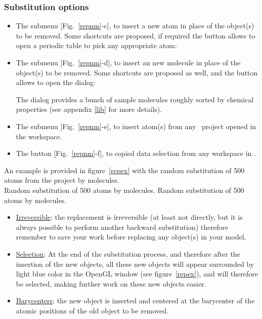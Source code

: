 \subsubsection*{Substitution options}
\begin{itemize}
\item The  submenu [Fig.~\ref{repnm}-c], to insert a new atom in place of the object(s) to be removed. 
Some shortcuts are proposed, if required the  button allows to open a periodic table to pick any appropriate atom: 
\begin{center}\end{center}
\item The  submenu [Fig.~\ref{repnm}-d], to insert an new molecule in place of the object(s) to be removed. 
Some shortcuts are proposed as well, and the  button allows to open the  dialog:
\begin{center}\end{center}
The  dialog provides a bunch of sample molecules roughly sorted by chemical properties (see appendix \ref{lib} for more details).
\item The  submenu [Fig.~\ref{repnm}-e], to insert atom(s) from any \atomes\ project opened in the workspace. 
\item The  button [Fig.~\ref{repnm}-f], to copied data selection from any workspace in \atomes. 
\end{itemize}
\noindent An example is provided in figure~\ref{repex} with the random substitution of 500  atoms from the \aob{\sio} project by  molecules. \\ 
{Random substitution of 500  atoms by  molecules.}
{Random substitution of 500  atoms by  molecules.}
\clearpage
{}
\begin{itemize}
\item \uline{Irreversible}: the replacement is irreversible (at least not directly, but it is always possible to perform another backward substitution)
therefore remember to save your work before replacing any object(s) in your model. 
\item \uline{Selection}: At the end of the substitution process, and therefore after the insertion of the new objects, 
all these new objects will appear surrounded by light blue color in the OpenGL window (see figure~\ref{repex}), and will therefore be selected, 
making further work on these new objects easier.  
\item \uline{Barycenters}: the new object is inserted and centered at the barycenter of the atomic positions of the old object to be removed.
\end{itemize}


